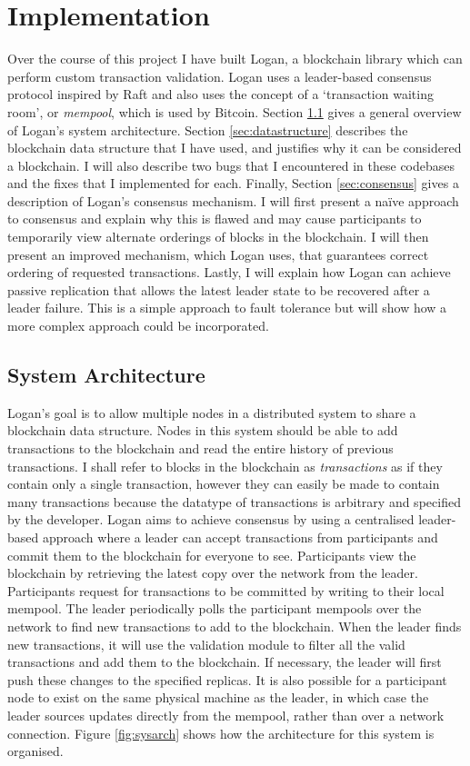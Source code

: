 \documentclass[12pt,a4paper,twoside,openright]{report}
\begin{document}
	\chapter{Implementation} \label{Implementation}
	Over the course of this project I have built Logan, a blockchain library which can perform custom transaction validation.
	Logan uses a leader-based consensus protocol inspired by Raft \parencite{Raft} and also uses the concept of a `transaction waiting room', or \textit{mempool}, which is used by Bitcoin.
	Section \ref{sec:sysarch} gives a general overview of Logan's system architecture.
	Section \ref{sec:datastructure} describes the blockchain data structure that I have used, and justifies why it can be considered a blockchain.
	I will also describe two bugs that I encountered in these codebases and the fixes that I implemented for each.
	Finally, Section \ref{sec:consensus} gives a description of Logan's consensus mechanism. 
	I will first present a na\"{i}ve approach to consensus and explain why this is flawed and may cause participants to temporarily view alternate orderings of blocks in the blockchain.
	I will then present an improved mechanism, which Logan uses, that guarantees correct ordering of requested transactions.
	Lastly, I will explain how Logan can achieve passive replication that allows the latest leader state to be recovered after a leader failure.
	This is a simple approach to fault tolerance but will show how a more complex approach could be incorporated.

	\section{System Architecture}\label{sec:sysarch}
	Logan's goal is to allow multiple nodes in a distributed system to share a blockchain data structure.
	Nodes in this system should be able to add transactions to the blockchain and read the entire history of previous transactions.
	I shall refer to blocks in the blockchain as \textit{transactions} as if they contain only a single transaction, however they can easily be made to contain many transactions because the datatype of transactions is arbitrary and specified by the developer.
	Logan aims to achieve consensus by using a centralised leader-based approach where a leader can accept transactions from participants and commit them to the blockchain for everyone to see.
	Participants view the blockchain by retrieving the latest copy over the network from the leader.
	Participants request for transactions to be committed by writing to their local mempool. 
	The leader periodically polls the participant mempools over the network to find new transactions to add to the blockchain.
	When the leader finds new transactions, it will use the validation module to filter all the valid transactions and add them to the blockchain.
	If necessary, the leader will first push these changes to the specified replicas.
	It is also possible for a participant node to exist on the same physical machine as the leader, in which case the leader sources updates directly from the mempool, rather than over a network connection. 
	Figure \ref{fig:sysarch} shows how the architecture for this system is organised.\\	
\end{document}
